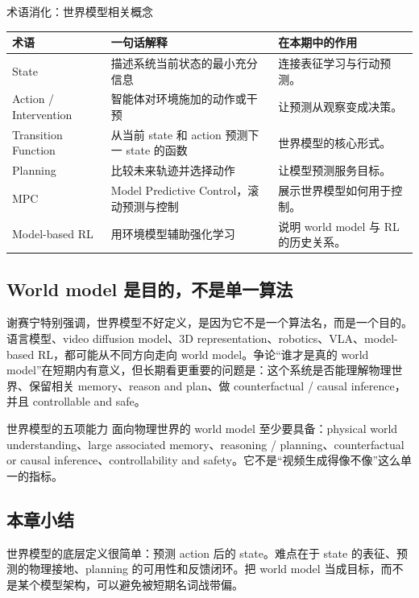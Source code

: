 \begin{knowledgebox}{术语消化：世界模型相关概念}
\begin{tabularx}{\textwidth}{p{}p{}X}
\toprule
术语 & 一句话解释 & 在本期中的作用 \\
\midrule
State & 描述系统当前状态的最小充分信息 & 连接表征学习与行动预测。 \\
Action / Intervention & 智能体对环境施加的动作或干预 & 让预测从观察变成决策。 \\
Transition Function & 从当前 state 和 action 预测下一 state 的函数 & 世界模型的核心形式。 \\
Planning & 比较未来轨迹并选择动作 & 让模型预测服务目标。 \\
MPC & Model Predictive Control，滚动预测与控制 & 展示世界模型如何用于控制。 \\
Model-based RL & 用环境模型辅助强化学习 & 说明 world model 与 RL 的历史关系。 \\
\bottomrule
\end{tabularx}
\end{knowledgebox}

\subsection{World model 是目的，不是单一算法}

谢赛宁特别强调，世界模型不好定义，是因为它不是一个算法名，而是一个目的。语言模型、video diffusion model、3D representation、robotics、VLA、model-based RL，都可能从不同方向走向 world model。争论“谁才是真的 world model”在短期内有意义，但长期看更重要的问题是：这个系统是否能理解物理世界、保留相关 memory、reason and plan、做 counterfactual / causal inference，并且 controllable and safe。

\begin{importantbox}{世界模型的五项能力}
面向物理世界的 world model 至少要具备：physical world understanding、large associated memory、reasoning / planning、counterfactual or causal inference、controllability and safety。它不是“视频生成得像不像”这么单一的指标。
\end{importantbox}

\subsection{本章小结}

世界模型的底层定义很简单：预测 action 后的 state。难点在于 state 的表征、预测的物理接地、planning 的可用性和反馈闭环。把 world model 当成目标，而不是某个模型架构，可以避免被短期名词战带偏。


